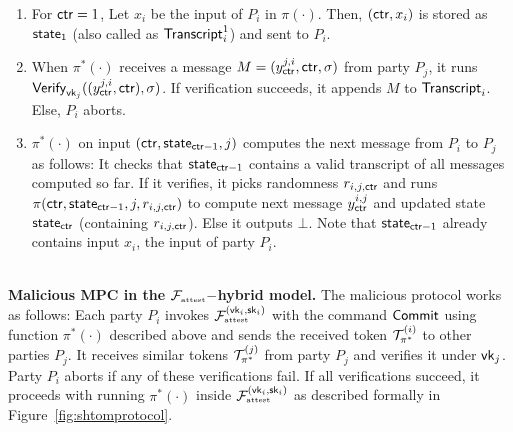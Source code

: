 \begin{enumerate}

\item For $\mathsf{ctr} = 1$, 
Let $x_i$ be the input of $P_i$ in $\pi(\cdot)$. Then,
$(\mathsf{ctr}, x_i)$ is stored as $\mathsf{state}_1$ (also called as $\mathsf{Transcript}^1_i$) and sent to $P_i$.

\item When $\pi^*(\cdot)$ receives a message $M =
  (y_{\mathsf{ctr}}^{j,i},\mathsf{ctr},\sigma)$ from party $P_j$, it runs
  $\mathsf{Verify}_{\mathsf{vk}_j}((y_{\mathsf{ctr}}^{j,i},\mathsf{ctr}),\sigma)$. If verification
  succeeds, it appends $M$ to $\mathsf{Transcript}_i$. Else, $P_i$ aborts.

\item $\pi^*(\cdot)$ on input $(\mathsf{ctr}, \mathsf{state}_{\mathsf{ctr}-1}, j)$ computes the
  next message from $P_i$ to $P_j$ as follows: It checks that
  $\mathsf{state}_{\mathsf{ctr}-1}$ contains a valid transcript of all messages computed
  so far. If it verifies, it picks randomness $r_{i,j,\mathsf{ctr}}$ and runs $\pi(\mathsf{ctr}, \mathsf{state}_{\mathsf{ctr}-1}, j, r_{i,j,\mathsf{ctr}})$ to compute next message $y^{i,j}_{\mathsf{ctr}}$ and updated state $\mathsf{state}_{\mathsf{ctr}}$ (containing $r_{i,j,\mathsf{ctr}}$). 
  Else it outputs $\bot$. 
Note that $\mathsf{state}_{\mathsf{ctr}-1}$ already contains
  input $x_i$, the input of party $P_i$.
\end{enumerate}~\\
\noindent\textbf{Malicious MPC in the $\mathcal{F}_{\textrm{\tiny{attest}}}-$hybrid model.}
\label{sec:shtomcompiler}
The malicious \mpc protocol works as follows: Each party $P_i$ invokes $\mathcal{F}_{\textrm{\tiny{attest}}}^{(\mathsf{vk}_i,\mathsf{sk}_i)}$ with the command $\mathsf{Commit}$ using function $\pi^*(\cdot)$ described above and sends the received token $\mathcal{T}^{(i)}_{\pi^*}$ to other parties $P_j$. It  receives similar tokens $\mathcal{T}^{(j)}_{\pi^*}$ from party $P_j$ and verifies it under $\mathsf{vk}_j$. Party $P_i$ aborts if any of these verifications fail. If all verifications succeed, it proceeds with running $\pi^*(\cdot)$ inside $\mathcal{F}_{\textrm{\tiny{attest}}}^{(\mathsf{vk}_i,\mathsf{sk}_i)}$ as described formally in Figure~\ref{fig:shtomprotocol}.



